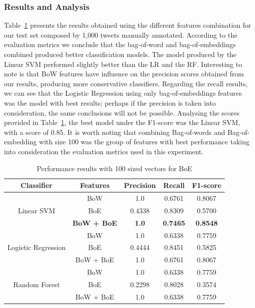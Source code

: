 \subsubsection{Results and Analysis}
\label{subsubsec:results_rio_de_janeiro_sao_paulo}
Table~\ref{classifiers} presents the results obtained using the different features combination for our test set composed by 1,000 tweets manually annotated. According to the evaluation metrics we conclude that the bag-of-word and bag-of-embeddings combined produced better classification models. The model produced by the Linear SVM performed slightly better than the LR and the RF. Interesting to note is that \gls{BoW} features have influence on the precision scores obtained from our results, producing more conservative classifiers. Regarding the recall results, we can see that the Logistic Regression using only bag-of-embeddings features was the model with best results; perhaps if the precision is taken into consideration, the same conclusions will not be possible. Analysing the scores provided in Table~\ref{classifiers}, the best model under the F1-score was the Linear SVM, with a score of 0.85. It is worth noting that combining Bag-of-words and Bag-of-embedding with size 100 was the group of features with best performance taking into consideration the evaluation metrics used in this experiment.

\begin{table}[!bp]
	\small
	\centering
	\caption{Performance results with 100 sized vectors for BoE}
	\label{classifiers}
	\begin{tabular}{c|c|c|c|c}
		\hline
		\textbf{Classifier}                  & \textbf{Features} & \textbf{Precision} & \textbf{Recall} & \textbf{F1-score} \\ \hline
		\multirow{3}{*}{Linear SVM}          & BoW               & 1.0                & 0.6761          & 0.8067            \\
		& BoE               & 0.4338             & 0.8309          & 0.5700            \\
		& \textbf{BoW + BoE}         & \textbf{1.0}       & \textbf{0.7465} & \textbf{0.8548}   \\ \hline
		\multirow{3}{*}{Logistic Regression} & BoW               & 1.0                & 0.6338          & 0.7759            \\
		& BoE               & 0.4444             & 0.8451          & 0.5825            \\
		& BoW + BoE         & 1.0                & 0.6761          & 0.8067            \\ \hline
		\multirow{3}{*}{Random Forest}       & BoW               & 1.0                & 0.6338          & 0.7759            \\
		& BoE               & 0.2298             & 0.8028          & 0.3574            \\
		& BoW + BoE         & 1.0                & 0.6338          & 0.7759            \\ \hline
	\end{tabular}
\end{table}


